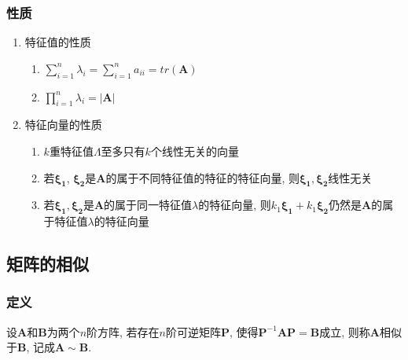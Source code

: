 \subsubsection{性质}
\begin{enumerate}
	\item 特征值的性质
	\begin{enumerate}
		\item $ \sum_{i=1}^{n}\lambda_{i}=\sum_{i=1}^{n}a_{ii}=tr(\bm{A}) $
		\item $ \prod_{i=1}^{n}\lambda_{i}=\left| \bm{A}\right| $
	\end{enumerate}
	\item 特征向量的性质
	\begin{enumerate}
		\item $ k $重特征值$ \Lambda $至多只有$ k $个线性无关的向量
		\item 若$ \bm{\xi_1} $, $ \bm{\xi_2} $是$ \bm{A} $的属于不同特征值的特征的特征向量, 则$ \bm{\xi_1}, \bm{\xi_2} $线性无关
		\item 若$ \bm{\xi_1}, \bm{\xi_2} $是$ \bm{A} $的属于同一特征值$ \lambda $的特征向量, 则$ k_1\bm{\xi_1} + k_1\bm{\xi_2} $仍然是$ \bm{A} $的属于特征值$ \lambda $的特征向量
	\end{enumerate}
\end{enumerate}
\subsection{矩阵的相似}
\subsubsection{定义}
设$ \bm{A} $和$ \bm{B} $为两个$ n $阶方阵, 若存在$ n $阶可逆矩阵$ \bm{P} $, 使得$ \bm{P}^{-1}\bm{A}\bm{P}=\bm{B} $成立, 则称$ \bm{A} $相似于$ \bm{B} $, 记成$ \bm{A}\sim \bm{B} $.
